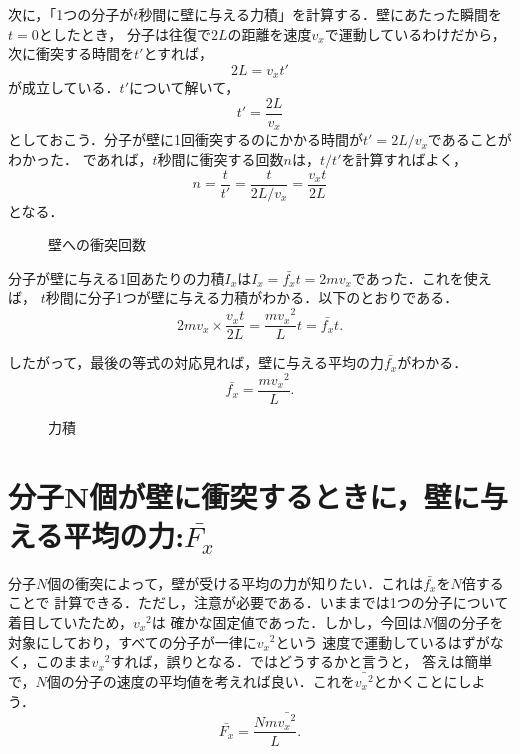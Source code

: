     次に，「1つの分子が$t$秒間に壁に与える力積」を計算する．壁にあたった瞬間を$t=0$としたとき，
    分子は往復で$2L$の距離を速度${v}_{x}$で運動しているわけだから，次に衝突する時間を$t'$とすれば，
    \[
        2L = {v}_{x}t'
    \]
    が成立している．$t'$について解いて，
    \[
        t' = \frac{2L}{{v}_{x}}
    \]
    としておこう．分子が壁に1回衝突するのにかかる時間が$t'=2L/{v}_{x}$であることがわかった．
    であれば，$t$秒間に衝突する回数$n$は，$t/t'$を計算すればよく，
    \[
        n = \frac{t}{t'}=\frac{t}{2L/{v}_{x}}=\frac{{v}_{x}t}{2L}
    \]
    となる．
    \begin{figure}[hbt]
        \begin{center}
            \caption{壁への衝突回数}
            \label{fig:netsurikigaku_bunsi_undo_ron2}
        \end{center}
    \end{figure}

    分子が壁に与える1回あたりの力積${I}_{x}$は${I}_{x} = \bar{{f}_{x}}  t = 2m{v}_{x}$であった．これを使えば，
    $t$秒間に分子1つが壁に与える力積がわかる．以下のとおりである．
    \[
        2m{v}_{x} \times \frac{{v}_{x}t}{2L}=\frac{m{{v}_{x}}^{2}}{L}t=\bar{{f}_{x}}  t.
    \]

    したがって，最後の等式の対応見れば，壁に与える平均の力$\bar{{f}_{x}}$がわかる．
    \begin{equation}
        \bar{{f}_{x}} = \frac{m{{v}_{x}}^{2}}{L}.
    \end{equation}

    \begin{figure}[hbt]
        \begin{center}
            \caption{力積}
            \label{fig:netsurikigaku_bunsi_undo_ron_rikiseki}
        \end{center}
    \end{figure}

    \section{分子N個が壁に衝突するときに，壁に与える平均の力:$\bar{{F}_{x}}$}
    分子$N$個の衝突によって，壁が受ける平均の力が知りたい．これは$\bar{{f}_{x}}$を$N$倍することで
    計算できる．ただし，注意が必要である．いままでは1つの分子について着目していたため，${{v}_{x}}^{2}$は
    確かな固定値であった．しかし，今回は$N$個の分子を対象にしており，すべての分子が一律に${{v}_{x}}^{2}$という
    速度で運動しているはずがなく，このまま${{v}_{x}}^{2}$すれば，誤りとなる．ではどうするかと言うと，
    答えは簡単で，$N$個の分子の速度の平均値を考えれば良い．これを$\bar{{{v}_{x}}^{2}}$とかくことにしよう．
    \begin{equation}
        \bar{{F}_{x}} = \frac{Nm\bar{{{v}_{x}}^{2}}}{L}.
    \end{equation}



